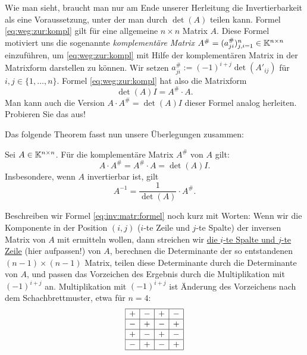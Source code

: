 Wie man sieht, braucht man nur am Ende unserer Herleitung die Invertierbarkeit als eine Voraussetzung, unter der man durch $\det(A)$ teilen kann. Formel \eqref{eq:weg:zur:kompl} gilt für eine allgemeine $n \times n$ Matrix $A$. Diese Formel motiviert uns die sogenannte  \emph{komplementäre Matrix} $ A^\# = (a_{ji}^\#){}_{j,i=1}^n \in \mathbb K^{n \times n} $ einzuführen, um \eqref{eq:weg:zur:kompl} mit Hilfe der komplementären Matrix in der Matrixform darstellen zu können. Wir setzen $a_{ji}^\# := (-1)^{i+j} \det(A'_{ij})$ für $i,j \in \{1,\ldots,n\}$. Formel \eqref{eq:weg:zur:kompl} hat also die Matrixform
\begin{equation}
	\det(A) I = A^\# \cdot A.
\end{equation}
Man kann auch die Version $ A \cdot A^\# = \det(A) I $ dieser Formel analog herleiten. Probieren Sie das aus!

Das folgende Theorem fasst nun unsere Überlegungen zusammen:

\begin{thm}
	Sei $ A \in \mathbb K^{n \times n} $. Für die komplementäre Matrix $ A^\# $ von $ A $ gilt:
	\begin{equation}
		A \cdot A^\# = A^\# \cdot A = \det(A) I.
	\end{equation}
	Insbesondere, wenn $ A $ invertierbar ist, gilt
	\begin{equation}
		\label{eq:inv:matr:formel}
		A^{-1} = \frac{1}{\det(A)} \cdot A^\#.
	\end{equation}
\end{thm}

Beschreiben wir Formel \eqref{eq:inv:matr:formel} noch kurz mit Worten: Wenn wir die Komponente in der Position $(i,j)$ ($i$-te Zeile und $j$-te Spalte) der inversen Matrix von $A$ mit ermitteln wollen, dann streichen wir \underline{die $i$-te Spalte und $j$-te Zeile} (hier aufpassen!) von $A$, berechnen die Determinante der so entstandenen $(n-1)\times (n-1)$ Matrix, teilen diese Determinante durch die Determinante von $A$, und passen das Vorzeichen des Ergebnis durch die Multiplikation mit $(-1)^{i+j}$ an. Multiplikation mit $(-1)^{i+j}$ ist Änderung des Vorzeichens nach dem Schachbrettmuster, etwa für $n=4$:
\[
	\begin{array}{|c|c|c|c|}
		\hline 
		 + & - & + & -
		 \\ \hline - & + & - & +
		 \\ \hline + & - & + & -
		 \\ \hline - & + & - & + 
		 \\ \hline 
	\end{array}
\]


